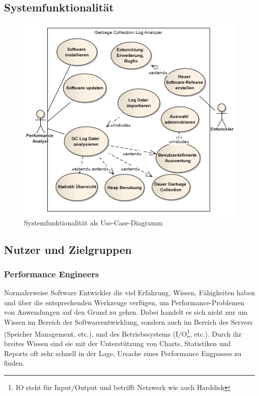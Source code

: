 \subsection{Systemfunktionalität}\label{systemfunktionalitaet}
 \begin{figure}[H]
  	\centering
        	\caption{Systemfunktionalität als Use-Case-Diagramm}
    	\includegraphics[width=15cm]{images/anforderungen_use-case}
\end{figure}
\subsection{Nutzer und Zielgruppen}
\subsubsection{Performance Engineers}
Normalerweise Software Entwickler die viel Erfahrung, Wissen, Fähigkeiten haben und über die entsprechenden Werkzeuge verfügen, um Performance-Problemen von Anwendungen auf den Grund zu gehen. Dabei handelt es sich nicht nur um Wissen im Bereich der Softwareentwicklung, sondern auch im Bereich des Servers (Speicher Management, etc.), und des Betriebssystems (I/O\footnote{IO steht für Input/Output und betrifft Netzwerk wie auch Harddisk}, etc.). Durch ihr breites Wissen sind sie mit der Unterstützung von Charts, Statistiken und Reports oft sehr schnell in der Lage, Ursache eines Performance Engpasses zu finden.

